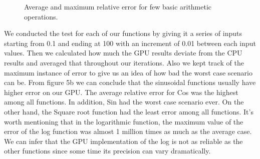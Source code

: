 \begin{figure}[!tbh]
 \centering  
  \caption{Average and maximum relative error for few basic arithmetic operations.}
   \label{fig:histogram_comparison}
\end{figure} 

We conducted the test for each of our functions by giving it a series of inputs starting from 0.1 and ending at 100 with an increment of 0.01 between each input values. Then we calculated how much the GPU results deviate from the CPU results and averaged that throughout our iterations. Also we kept track of the maximum instance of error to give us an idea of how bad the worst case scenario can be. From figure 5b we can conclude that the sinusoidal functions usually have higher error on our GPU. The average relative error for Cos was the highest among all functions. In addition, Sin had the worst case scenario ever. On the other hand, the Square root function had the least error among all functions. It's worth mentioning that in the logarithmic function, the maximum value of the error of the log function was almost 1 million times as much as the average case. We can infer that the GPU implementation of the log is not as reliable as the other functions since some time its precision can vary dramatically.

